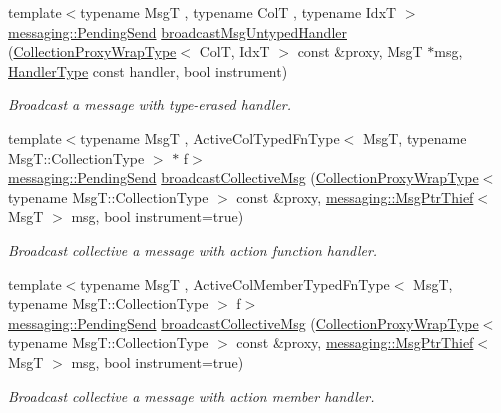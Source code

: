 \begin{DoxyCompactItemize}
{\footnotesize template$<$typename MsgT , typename ColT , typename IdxT $>$ }\\\hyperlink{structvt_1_1messaging_1_1_pending_send}{messaging\+::\+Pending\+Send} \hyperlink{structvt_1_1vrt_1_1collection_1_1_collection_manager_a3a0ce58242fe4a9f18ca105ba9d9e8ea}{broadcast\+Msg\+Untyped\+Handler} (\hyperlink{structvt_1_1vrt_1_1collection_1_1_collection_manager_a56458ed7f9bb22b631b9b3a745f42f94}{Collection\+Proxy\+Wrap\+Type}$<$ ColT, IdxT $>$ const \&proxy, MsgT $\ast$msg, \hyperlink{namespacevt_af64846b57dfcaf104da3ef6967917573}{Handler\+Type} const handler, bool instrument)
\begin{DoxyCompactList}\small\item\em Broadcast a message with type-\/erased handler. \end{DoxyCompactList}\item 
{\footnotesize template$<$typename MsgT , Active\+Col\+Typed\+Fn\+Type$<$ Msg\+T, typename Msg\+T\+::\+Collection\+Type $>$ $\ast$ f$>$ }\\\hyperlink{structvt_1_1messaging_1_1_pending_send}{messaging\+::\+Pending\+Send} \hyperlink{structvt_1_1vrt_1_1collection_1_1_collection_manager_ae119b6f5097f722c4e965c9c1203943c}{broadcast\+Collective\+Msg} (\hyperlink{structvt_1_1vrt_1_1collection_1_1_collection_manager_a56458ed7f9bb22b631b9b3a745f42f94}{Collection\+Proxy\+Wrap\+Type}$<$ typename Msg\+T\+::\+Collection\+Type $>$ const \&proxy, \hyperlink{structvt_1_1messaging_1_1_msg_ptr_thief}{messaging\+::\+Msg\+Ptr\+Thief}$<$ MsgT $>$ msg, bool instrument=true)
\begin{DoxyCompactList}\small\item\em Broadcast collective a message with action function handler. \end{DoxyCompactList}\item 
{\footnotesize template$<$typename MsgT , Active\+Col\+Member\+Typed\+Fn\+Type$<$ Msg\+T, typename Msg\+T\+::\+Collection\+Type $>$ f$>$ }\\\hyperlink{structvt_1_1messaging_1_1_pending_send}{messaging\+::\+Pending\+Send} \hyperlink{structvt_1_1vrt_1_1collection_1_1_collection_manager_ae119b6f5097f722c4e965c9c1203943c}{broadcast\+Collective\+Msg} (\hyperlink{structvt_1_1vrt_1_1collection_1_1_collection_manager_a56458ed7f9bb22b631b9b3a745f42f94}{Collection\+Proxy\+Wrap\+Type}$<$ typename Msg\+T\+::\+Collection\+Type $>$ const \&proxy, \hyperlink{structvt_1_1messaging_1_1_msg_ptr_thief}{messaging\+::\+Msg\+Ptr\+Thief}$<$ MsgT $>$ msg, bool instrument=true)
\begin{DoxyCompactList}\small\item\em Broadcast collective a message with action member handler. \end{DoxyCompactList}\item 

\end{DoxyCompactItemize}
